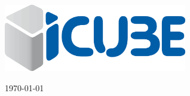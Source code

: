\documentclass{ter}
\begin{document}
\begin{center}
  \medskip

  \includegraphics[width=8cm]{logos/icube.png}

  {
  \begin{otherlanguage}{french}
    \small \today
  \end{otherlanguage}
  }
\end{center}

\cleardoublepage


\tableofcontents

{
  \listoffigures
  \listoftables
}

\cleardoublepage

\begin{abstract}

\end{abstract}















\clearpage



\end{document}

